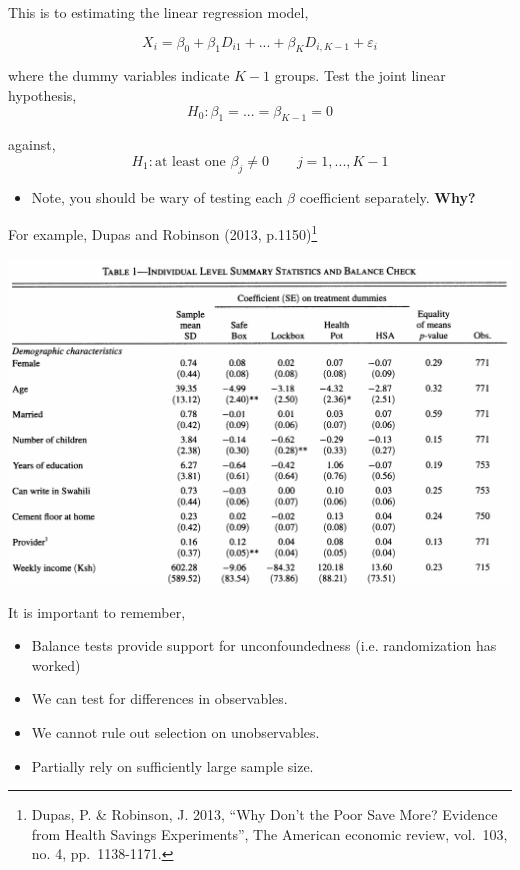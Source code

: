 \documentclass[
  letterpaper,
  DIV=11,
  numbers=noendperiod]{scrreprt}
\providecommand{\tightlist}{%
  \setlength{\itemsep}{0pt}\setlength{\parskip}{0pt}}\usepackage{longtable,booktabs,array}
\theoremstyle{definition}
\theoremstyle{remark}
\begin{document}
This is to estimating the linear regression model,

\[
            X_i = \beta_0 + \beta_1D_{i1}+...+ \beta_KD_{i,K-1}+\varepsilon_i
\]

where the dummy variables indicate \(K-1\) groups. Test the joint linear
hypothesis, \[
            H_0: \beta_1 = ... = \beta_{K-1} = 0
\]

against, \[
            H_1: \text{at least one }\beta_j\neq0\qquad j=1,...,K-1
\]

\begin{itemize}
\tightlist
\item
  Note, you should be wary of testing each \(\beta\) coefficient
  separately. \textbf{Why?}
\end{itemize}

For example, Dupas and Robinson (2013, p.1150)\footnote{Dupas, P. \&
  Robinson, J. 2013, ``Why Don't the Poor Save More? Evidence from
  Health Savings Experiments'', The American economic review, vol.~103,
  no. 4, pp.~1138-1171.}

\includegraphics{Images/Dupas_Baseline_1.png}

It is important to remember,

\par

\begin{itemize}
\tightlist
\item
  Balance tests provide support for unconfoundedness (i.e. randomization
  has worked)
\item
  We can test for differences in observables.
\item
  We cannot rule out selection on unobservables.
\item
  Partially rely on sufficiently large sample size.
\end{itemize}
\end{document}
